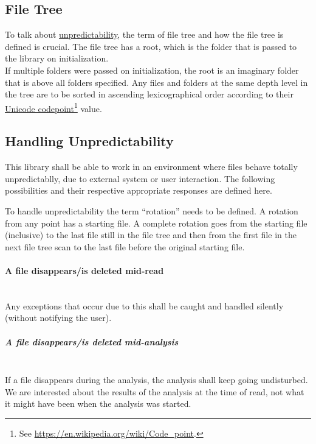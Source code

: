 \documentclass[11pt]{article} %
\begin{document}
    \subsection{File Tree}\label{sec:3.1}

    To talk about \hyperref[sec:3.1]{unpredictability}, the term of file tree and how the file tree is defined is crucial. The file tree has a root, which is the folder that is passed to the library on initialization.\\If multiple folders were passed on initialization, the root is an imaginary folder that is above all folders specified. Any files and folders at the same depth level in the tree are to be sorted in ascending lexicographical order according to their \href{https://en.wikipedia.org/wiki/Code_point}{Unicode codepoint}\footnote{See \url{https://en.wikipedia.org/wiki/Code_point}.} value.

    \subsection{Handling Unpredictability}\label{sec:3.2}

    This library shall be able to work in an environment where files behave totally unpredictablly, due to external system or user interaction. The following possibilities and their respective appropriate responses are defined here.

    To handle unpredictability the term ``rotation'' needs to be defined. A rotation from any point has a starting file. A complete rotation goes from the starting file (inclusive) to the last file still in the file tree and then from the first file in the next file tree scan to the last file before the original starting file.

    \paragraph{A file disappears/is deleted mid-read}\label{par:file_disappear} ~\\
    Any exceptions that occur due to this shall be caught and handled silently (without notifying the user).

    \subparagraph{A file disappears/is deleted mid-analysis} ~\\
    If a file disappears during the analysis, the analysis shall keep going undisturbed. We are interested about the results of the analysis at the time of read, not what it might have been when the analysis was started.
\end{document}
